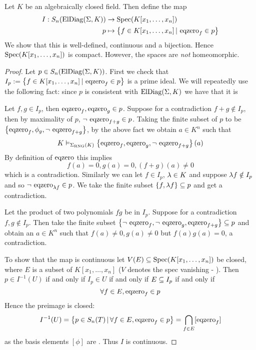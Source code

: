\begin{prop}
    Let $K$ be an algebraically closed field.
    Then define the map
    \begin{align*}
        I : S_n(\mathrm{ElDiag}(\Sigma,K)) &\to \operatorname{Spec}(K[x_1,\dots,x_n])\\
        p &\mapsto \left\{f \in K[x_1,\dots,x_n] \,|\, \operatorname{eqzero}_f \in p\right\}
    \end{align*}
    We show that this is well-defined, continuous and a bijection.
    Hence $\operatorname{Spec}(K[x_1,\dots,x_n])$ is compact.
    However, the spaces are \emph{not} homeomorphic.
\end{prop}
\begin{proof}
    Let $p \in S_n(\mathrm{ElDiag}(\Sigma,K))$.
    First we check that 
    $I_p := \left\{f \in K[x_1,\dots,x_n] \,|\, \operatorname{eqzero}_f \in p\right\}$
    is a prime ideal.
    We will repeatedly use the following fact:
    since $p$ is consistent with $\mathrm{ElDiag}(\Sigma,K)$ we have that it is

    Let $f,g \in I_p$, then $\operatorname{eqzero}_f,\operatorname{eqzero}_g \in p$.
    Suppose for a contradiction $f+g \notin I_p$, then by maximality of $p$,
    $\neg\, \operatorname{eqzero}_{f+g} \in p$.
    Taking the finite subset of $p$ to be 
    $\left\{\operatorname{eqzero}_f,\phi_g,\neg\, \operatorname{eqzero}_{f+g}\right\}$,
    by the above fact we obtain $a \in K^n$ such that 
    \[K \vDash_{\Sigma_{\mathrm{RNG}}(K)} 
    \left\{\operatorname{eqzero}_f,\operatorname{eqzero}_g,\neg\, \operatorname{eqzero}_{f+g}\right\}(a)\]
    By definition of $\operatorname{eqzero}$ this implies
    \[f(a) = 0,g(a) = 0,(f+g)(a) \ne 0\]
    which is a contradiction.
    Similarly we can let $f \in I_p$, $\lambda \in K$ 
    and suppose $\lambda f \notin I_p$ and so $\neg\, \operatorname{eqzero}_{\lambda f} \in p$.
    We take the finite subset $\left\{f, \lambda f\right\} \subseteq p$ and get a contradiction.

    Let the product of two polynomials $fg$ be in $I_p$. 
    Suppose for a contradiction $f,g \notin I_p$.
    Then take the finite subset 
    $\left\{\neg\, \operatorname{eqzero}_f, \neg\, \operatorname{eqzero}_g, \operatorname{eqzero}_{f+g}\right\} \subseteq p$ and obtain
    an $a \in K^n$ such that $f(a) \ne 0, g(a) \ne 0$ but $f(a)g(a) = 0$,
    a contradiction.

    To show that the map is continuous let 
    $V(E) \subseteq \operatorname{Spec}(K[x_1,\dots,x_n])$ be closed,
    where $E$ is a subset of $K[x_1,\dots,x_n]$ 
    ($V$ denotes the spec vanishing - 
    ).
    Then $p \in I^{-1}(U)$ if and only if $I_p \in U$
    if and only if $E \subseteq I_p$ if and only if 
    \[\forall f \in E, \operatorname{eqzero}_f \in p\]
    Hence the preimage is closed:
    \[  
        I^{-1}(U) = \left\{p \in S_n(T) \,|\, \forall f \in E, \operatorname{eqzero}_f \in p\right\}
        = \bigcap_{f \in E} [\operatorname{eqzero}_f]
    \]
    as the basis elements $[\phi]$ are 
    .
    Thus $I$ is continuous.


\end{proof}
